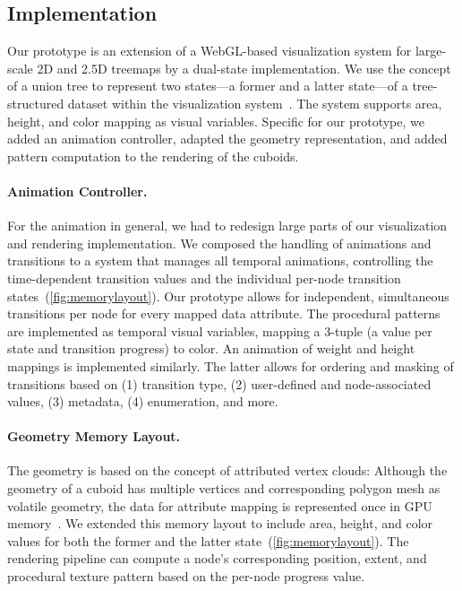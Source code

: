 \documentclass[smallextended,natbib]{svjour3}       %
\begin{document}
\subsection{Implementation}
\label{sec:implementation}
Our prototype is an extension of a WebGL-based visualization system for large-scale 2D and 2.5D treemaps by a dual-state implementation.
We use the concept of a union tree to represent two states---a former and a latter state---of a tree-structured dataset within the visualization system~\citep{tu2007-changes}.
The system supports area, height, and color mapping as visual variables.
Specific for our prototype, we added an animation controller, adapted the geometry representation, and added pattern computation to the rendering of the cuboids.

\paragraph{Animation Controller.}
For the animation in general, we had to redesign large parts of our visualization and rendering implementation.
We composed the handling of animations and transitions to a system that manages all temporal animations, controlling the time-dependent transition values and the individual per-node transition states~(\autoref{fig:memorylayout}).
Our prototype allows for independent, simultaneous transitions per node for every mapped data attribute.
The procedural patterns are implemented as temporal visual variables, mapping a 3-tuple (a value per state and transition progress) to color.
An animation of weight and height mappings is implemented similarly.
The latter allows for ordering and masking of transitions based on (1) transition type, (2) user-defined and node-associated values, (3) metadata, (4) enumeration, and more.

\paragraph{Geometry Memory Layout.}
The geometry is based on the concept of attributed vertex clouds: Although the geometry of a cuboid has multiple vertices and corresponding polygon mesh as volatile geometry, the data for attribute mapping is represented once in GPU memory~\citep{scheibel2017-attributedvertexclouds}.
We extended this memory layout to include area, height, and color values for both the former and the latter state~(\autoref{fig:memorylayout}).
The rendering pipeline can compute a node's corresponding position, extent, and procedural texture pattern based on the per-node progress value.
\end{document}
